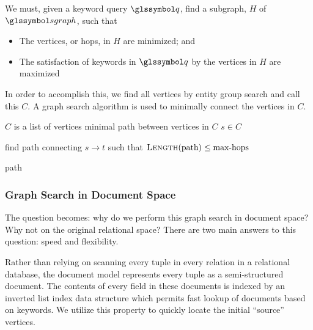 			We must, given a keyword query \(\q\), find a subgraph, \(H\) of \(\sgraph{}\), such that
			
			\begin{itemize}
				\item The vertices, or hops, in \(H\) are minimized; and
				\item The satisfaction of keywords in \(\q\) by the vertices in \(H\) are maximized
			\end{itemize}
			
			
			In order to accomplish this, we find all vertices by entity group search and call this \(C\).  A graph search algorithm is used to minimally connect the vertices in \(C\).
			
			\begin{algorithm}[!ht]
				\caption{\(\textsc{Graph-Search}(C)\)}
				\label{alg:graph-search}
				
				\begin{singlespaced}
					\begin{algorithmic}[1]
						\REQUIRE \(C\) is a list of vertices
						\ENSURE minimal path between vertices in \(C\)
						\medskip
						\STATE \(s \in C\)
						
							\STATE find path connecting \(s \rightarrow t\) such that \(\textsc{Length}(\text{path}) \le \text{max-hops}\)
						\ENDFOR
						
						\RETURN path
						\medskip
						\medskip
					\end{algorithmic}
				\end{singlespaced}
			\end{algorithm}
		
		\subsubsection{Graph Search in Document Space}
			The question becomes:  why do we perform this graph search in document space?  Why not on the original relational space?  There are two main answers to this question:  speed and flexibility.
			
			Rather than relying on scanning every tuple in every relation in a relational database, the document model represents every tuple as a semi-structured document.  The contents of every field in these documents is indexed by an inverted list index data structure which permits fast lookup of documents based on keywords.  We utilize this property to quickly locate the initial ``source'' vertices.
			
